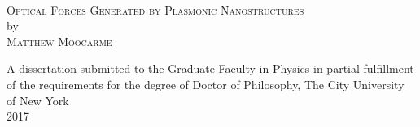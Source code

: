 \begin{titlepage}

\begin{center}

~\vspace{2in}

\textsc{Optical Forces Generated by Plasmonic Nanostructures} \\[0.5in]
by \\[0.5in]
\textsc{Matthew Moocarme} 

\vspace{\fill}
A dissertation submitted to the Graduate Faculty in Physics in partial fulfillment of the requirements for the degree of Doctor of Philosophy, The City University of New York \\[0.25in]
2017

\end{center}

\end{titlepage}
